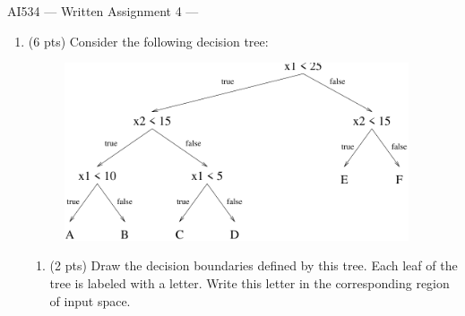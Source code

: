 \documentclass{article}
\def\centerps#1{\begin{center}
\leavevmode
\epsfbox{#1}
\end{center}}
\begin{document}
{\Large
\begin{center}
AI534 --- Written Assignment 4 ---
\end{center}
}
\begin{enumerate}
\item (6 pts) Consider the following decision tree:\\
\begin{figure}[h]
\begin{center}
\includegraphics[width=4in]{tree1.pdf}
\end{center}
\end{figure}

\begin{enumerate}

\item (2 pts) Draw the decision boundaries defined by this tree. Each
leaf of the tree is labeled with a letter.  Write this
letter in the corresponding region of input space.\\



\end{enumerate}
\end{enumerate}
\end{document}
